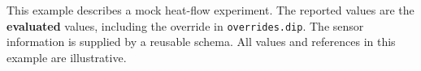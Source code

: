 This example describes a mock heat-flow experiment. The reported values are
the \textbf{evaluated} values, including the override in \texttt{overrides.dip}.
The sensor information is supplied by a reusable schema. All values and
references in this example are illustrative.
